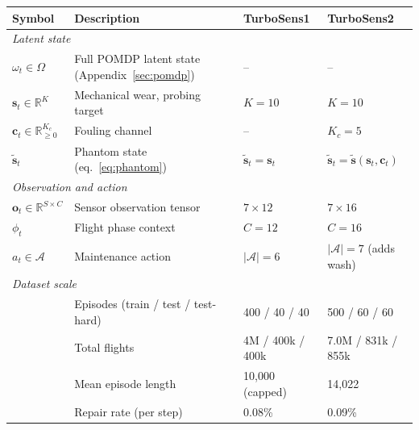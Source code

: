 \documentclass{article}
\begin{document}
\begin{table}[h]
\centering
\small
\setlength{\tabcolsep}{4pt}
\begin{tabular}{llll}
\toprule
\textbf{Symbol} & \textbf{Description} & \textbf{TurboSens1} & \textbf{TurboSens2} \\
\midrule
\multicolumn{4}{l}{\textit{Latent state}} \\
$\omega_t \in \Omega$                   & Full POMDP latent state (Appendix~\ref{sec:pomdp})  & --                 & --                 \\
$\mathbf{s}_t \in \mathbb{R}^K$         & Mechanical wear, probing target                    & $K{=}10$            & $K{=}10$            \\
$\mathbf{c}_t \in \mathbb{R}_{\ge 0}^{K_c}$ & Fouling channel                                 & --                 & $K_c{=}5$            \\
$\tilde{\mathbf{s}}_t$                  & Phantom state (eq.~\ref{eq:phantom})               & $\tilde{\mathbf{s}}_t = \mathbf{s}_t$ & $\tilde{\mathbf{s}}_t = \tilde{\mathbf{s}}(\mathbf{s}_t, \mathbf{c}_t)$ \\
\midrule
\multicolumn{4}{l}{\textit{Observation and action}} \\
$\mathbf{o}_t \in \mathbb{R}^{S \times C}$ & Sensor observation tensor                       & $7 \times 12$       & $7 \times 16$       \\
$\phi_t$                                & Flight phase context                               & $C{=}12$            & $C{=}16$            \\
$a_t \in \mathcal{A}$                   & Maintenance action                                 & $|\mathcal{A}|{=}6$  & $|\mathcal{A}|{=}7$ (adds wash) \\
\midrule
\multicolumn{4}{l}{\textit{Dataset scale}} \\
                                        & Episodes (train / test / test-hard)                & 400 / 40 / 40       & 500 / 60 / 60       \\
                                        & Total flights                                       & 4M / 400k / 400k    & 7.0M / 831k / 855k  \\
                                        & Mean episode length                                 & 10{,}000 (capped)   & 14{,}022             \\
                                        & Repair rate (per step)                             & 0.08\%              & 0.09\%              \\

\end{tabular}
\end{table}
\end{document}
